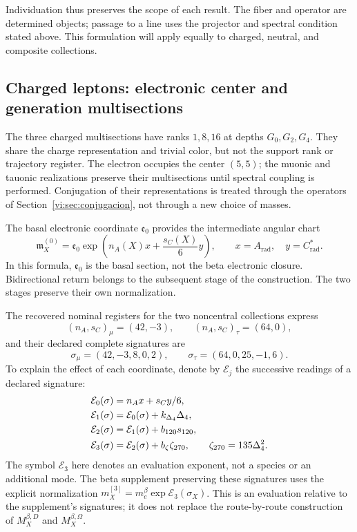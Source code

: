 Individuation thus preserves the scope of each result. The fiber
and operator are determined objects; passage to a line uses the
projector and spectral condition stated above. This formulation will apply
equally to charged, neutral, and composite collections.

\subsection{Charged leptons: electronic center and generation multisections}
\label{vi:subsec:leptones-cargados}

The three charged multisections have ranks \(1,8,16\) at depths
\(G_0,G_2,G_4\). They share the charge representation and trivial
color, but not the support rank or trajectory register.
The electron occupies the center \((5,5)\); the muonic and
tauonic realizations preserve their multisections until spectral
coupling is performed. Conjugation of their representations is treated through the
operators of Section~\ref{vi:sec:conjugacion}, not through a new
choice of masses.

The basal electronic coordinate \(\mathfrak e_0\) provides the intermediate
angular chart
\begin{equation}
 \mathfrak m_X^{(0)}=\mathfrak e_0
 \exp\left(n_A(X)x+\frac{s_C(X)}6y\right),
 \qquad x=A_{\mathrm{rad}},\quad y=C^*_{\mathrm{rad}}.
 \label{vi:eq:carta-angular-familias}
\end{equation}
In this formula, \(\mathfrak e_0\) is the basal section, not the beta
electronic closure. Bidirectional return belongs to the subsequent stage
of the construction. The two stages preserve their own normalization.

The recovered nominal registers for the two noncentral collections
express
\[
 (n_A,s_C)_\mu=(42,-3),\qquad (n_A,s_C)_\tau=(64,0),
\]
and their declared complete signatures are
\begin{equation}
 \sigma_\mu=(42,-3,8,0,2),\qquad
 \sigma_\tau=(64,0,25,-1,6).
 \label{vi:eq:firmas-muon-tau}
\end{equation}
To explain the effect of each coordinate, denote by \(\mathcal E_j\)
the successive readings of a declared signature:
\begin{align}
 \mathcal E_0(\sigma)&=n_Ax+s_Cy/6,\notag\\
 \mathcal E_1(\sigma)&=\mathcal E_0(\sigma)+k_{\Delta_4}\Delta_4,\notag\\
 \mathcal E_2(\sigma)&=\mathcal E_1(\sigma)+b_{120}s_{120},\notag\\
 \mathcal E_3(\sigma)&=\mathcal E_2(\sigma)+b_\zeta\zeta_{270},
 \qquad\zeta_{270}=135\Delta_4^2.
 \label{vi:eq:etapas-e3-sectoriales}
\end{align}
The symbol \(\mathcal E_3\) here denotes an evaluation exponent,
not a species or an additional mode. The beta supplement preserving these
signatures uses the explicit normalization
\(m_X^{[3]}=m_e^\beta\exp\mathcal E_3(\sigma_X)\).
This is an evaluation relative to the supplement's signatures; it does not replace
the route-by-route construction of \(M_X^{\beta,D}\) and
\(M_X^{\beta,\Omega}\).

